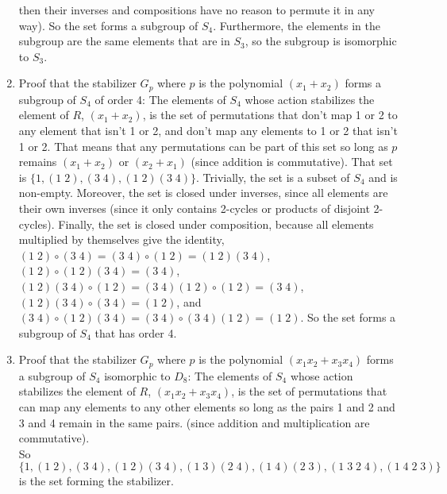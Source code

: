 \documentclass{article}
\begin{document}
\begin{enumerate}[label=\textbf{\alph*.}]
            then their inverses and compositions have no reason to
            permute it in any way).
            So the set forms a subgroup of $S_4$.
            Furthermore, the elements in the subgroup
            are the same elements that are in $S_3$,
            so the subgroup is isomorphic to $S_3$.
        \item
            Proof that the stabilizer $G_p$
            where $p$ is the polynomial $(x_1 + x_2)$
            forms a subgroup of $S_4$ of order 4:
            The elements of $S_4$ whose action stabilizes the element 
            of $R$, $(x_1 + x_2)$,
            is the set of permutations that don't map 1 or 2
            to any element that isn't 1 or 2, and don't map
            any elements to 1 or 2 that isn't 1 or 2.
            That means that any permutations can be part of this set
            so long as $p$ remains $(x_1 + x_2)$ or $(x_2 + x_1)$
            (since addition is commutative).
            That set is $\{1, (1\;2), (3\;4), (1\;2)(3\;4)\}$.
            Trivially, the set is a subset of $S_4$ and is non-empty.
            Moreover, the set is closed under inverses,
            since all elements are their own inverses (since it
            only contains 2-cycles or products of disjoint 2-cycles).
            Finally, the set is closed under composition,
            because all elements multiplied by themselves give
            the identity,
            $(1\;2) \circ (3\;4) = (3\;4) \circ (1\;2) = (1\;2)(3\;4)$,
            $(1\;2) \circ (1\;2)(3\;4) = (3\;4)$,
            $(1\;2)(3\;4) \circ (1\;2) = (3\;4)(1\;2) \circ (1\;2) = (3\;4)$,
            $(1\;2)(3\;4) \circ (3\;4) = (1\;2)$,
            and
            $(3\;4) \circ (1\;2)(3\;4) = (3\;4) \circ (3\;4)(1\;2) = (1\;2)$.
            So the set forms a subgroup of $S_4$ that has order 4.
        \item
            Proof that the stabilizer $G_p$
            where $p$ is the polynomial $(x_1x_2 + x_3x_4)$
            forms a subgroup of $S_4$ isomorphic to $D_8$:
            The elements of $S_4$ whose action stabilizes the element 
            of $R$, $(x_1x_2 + x_3x_4)$,
            is the set of permutations that can map any elements
            to any other elements so long
            as the pairs 1 and 2 and 3 and 4 remain in the same pairs.
            (since addition and multiplication are commutative). \\
            So $\{1, (1\;2), (3\;4), (1\;2)(3\;4),
            (1\;3)(2\;4), (1\;4)(2\;3), (1\;3\;2\;4), (1\;4\;2\;3)\}$
            is the set forming the stabilizer.

\end{enumerate}
\end{document}
